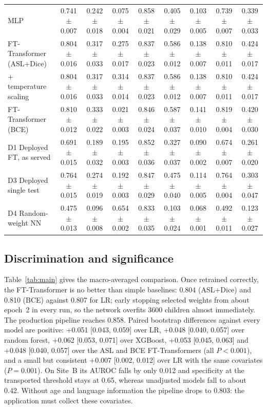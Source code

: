 \documentclass[conference]{IEEEtran}
\newcommand{\pmsd}[2]{#1{\scriptsize$\pm$#2}}
\begin{document}
\begin{table}[!t]
\begin{tabular}{lcccccccc}
MLP & \pmsd{0.741}{0.007} & \pmsd{0.242}{0.018} & \pmsd{0.075}{0.004} & \pmsd{0.858}{0.021} & \pmsd{0.405}{0.029} & \pmsd{0.103}{0.005} & \pmsd{0.739}{0.007} & \pmsd{0.339}{0.033} \\
FT-Transformer (ASL+Dice) & \pmsd{0.804}{0.016} & \pmsd{0.317}{0.033} & \pmsd{0.275}{0.017} & \pmsd{0.837}{0.023} & \pmsd{0.586}{0.012} & \pmsd{0.138}{0.007} & \pmsd{0.810}{0.011} & \pmsd{0.424}{0.017} \\
\quad + temperature scaling & \pmsd{0.804}{0.016} & \pmsd{0.317}{0.033} & \pmsd{0.314}{0.014} & \pmsd{0.837}{0.023} & \pmsd{0.586}{0.012} & \pmsd{0.138}{0.007} & \pmsd{0.810}{0.011} & \pmsd{0.424}{0.017} \\
FT-Transformer (BCE) & \pmsd{0.810}{0.012} & \pmsd{0.333}{0.022} & \pmsd{0.021}{0.003} & \pmsd{0.846}{0.024} & \pmsd{0.587}{0.037} & \pmsd{0.141}{0.010} & \pmsd{0.819}{0.004} & \pmsd{0.420}{0.030} \\
\midrule
D1 Deployed FT, as served & \pmsd{0.691}{0.015} & \pmsd{0.189}{0.032} & \pmsd{0.195}{0.003} & \pmsd{0.852}{0.036} & \pmsd{0.327}{0.037} & \pmsd{0.090}{0.002} & \pmsd{0.674}{0.007} & \pmsd{0.261}{0.020} \\
D3 Deployed single test & \pmsd{0.764}{0.015} & \pmsd{0.274}{0.019} & \pmsd{0.192}{0.003} & \pmsd{0.847}{0.029} & \pmsd{0.475}{0.040} & \pmsd{0.114}{0.005} & \pmsd{0.764}{0.004} & \pmsd{0.303}{0.047} \\
D4 Random-weight NN & \pmsd{0.475}{0.013} & \pmsd{0.096}{0.008} & \pmsd{0.654}{0.002} & \pmsd{0.833}{0.035} & \pmsd{0.103}{0.024} & \pmsd{0.068}{0.001} & \pmsd{0.492}{0.011} & \pmsd{0.123}{0.027} \\
\bottomrule
\end{tabular}
\end{table}

\subsection{Discrimination and significance}
Table~\ref{tab:main} gives the macro-averaged comparison. Once retrained correctly, the FT-Transformer is no better than simple baselines: 0.804 (ASL+Dice) and 0.810 (BCE) against 0.807 for LR; early stopping selected weights from about epoch~2 in every run, so the network overfits 3600 children almost immediately. The production pipeline reaches 0.858. Paired bootstrap differences against every model are positive: +0.051 [0.043, 0.059] over LR, +0.048 [0.040, 0.057] over random forest, +0.062 [0.053, 0.071] over XGBoost, +0.053 [0.045, 0.063] and +0.048 [0.040, 0.057] over the ASL and BCE FT-Transformers (all $P{<}0.001$), and a small but consistent +0.007 [0.002, 0.012] over LR with the same covariates ($P{=}0.001$). On Site~B its AUROC falls by only 0.012 and specificity at the transported threshold stays at 0.65, whereas unadjusted models fall to about 0.42. Without age and language information the pipeline drops to 0.803: the application must collect these covariates.
\end{document}
